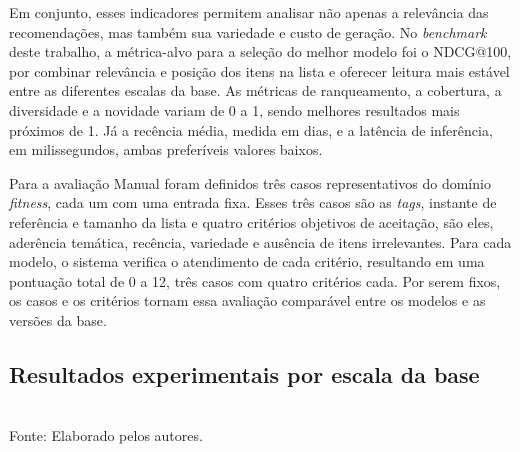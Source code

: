 \documentclass[a4paper,12pt]{article}
\begin{document}
{Em conjunto, esses indicadores permitem analisar não apenas a relevância das recomendações, mas também sua variedade e custo de geração. No \textit{benchmark} deste trabalho, a métrica-alvo para a seleção do melhor modelo foi o NDCG@100, por combinar relevância e posição dos itens na lista e oferecer leitura mais estável entre as diferentes escalas da base. As métricas de ranqueamento, a cobertura, a diversidade e a novidade variam de 0 a 1, sendo melhores resultados mais próximos de 1. Já a recência média, medida em dias, e a latência de inferência, em milissegundos, ambas preferíveis valores baixos.

Para a avaliação Manual foram definidos três casos representativos do domínio \textit{fitness}, cada um com uma entrada fixa. Esses três casos são as \textit{tags}, instante de referência e tamanho da lista e quatro critérios objetivos de aceitação, são eles, aderência temática, recência, variedade e ausência de itens irrelevantes. Para cada modelo, o sistema verifica o atendimento de cada critério, resultando em uma pontuação total de 0 a 12, três casos com quatro critérios cada. Por serem fixos, os casos e os critérios tornam essa avaliação comparável entre os modelos e as versões da base.



\subsection{Resultados experimentais por escala da base}


\begin{table}[H]
\centering
\caption{Resultados da rodada inicial na versão \texttt{SF0.1}}
\label{tab:resultados_sf01}
\scriptsize
{}
\small \\ Fonte: Elaborado pelos autores.
\end{table}

}
\end{document}
